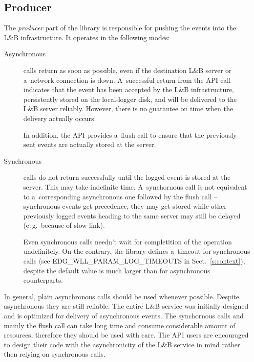 \documentclass{egee}
\def\LB{L\&B\xspace}
\def\eg{e.\,g.\xspace}
\begin{document}
\subsection{Producer}
\label{s:producer}
The \emph{producer} part of the library is responsible for
pushing the events into the \LB infrastructure.
It operates in the following modes:
\begin{description}
\item[Asynchronous] calls return as soon as possible, even if
the destination \LB server or a~network connection is down.
A~successful return from the API call
indicates that the event has been accepted by the \LB infrastructure,
persistently stored on the local-logger disk, and will be delivered to
the \LB server reliably.
However, there is no guarantee on time when the delivery actually occurs.

In addition, the API provides a~flush call to ensure that the previously
sent events are actually stored at the server.
\item[Synchronous] calls do not return successfully
until the logged event is stored at the server. 
This may take indefinite time.
A~synchornous call is not equivalent to a~corresponding asynchronous one
followed by the flush call -- synchronous events get precedence,
they may get stored while other previously logged
events heading to the same server may still be delayed (\eg\ because of
slow link).

Even synchronous calls needn't wait for completition of the operation
undefinitely.
On the contrary, the library defines a~timeout for synchronous calls
(see EDG\_WLL\_PARAM\_LOG\_TIMEOUTS in Sect.~\ref{s:context}),
despite the default value is much larger than for asynchronous counterparts.

\end{description}

In general, plain asynchronous calls should be used whenever possible.
Despite asynchronous they are still reliable.
The entire \LB service was initially designed and is optimized for delivery of 
asynchronous events.
The synchornous calls and mainly the flush call can take long time and consume
considerable amount of resources, therefore they should be used with care.
The API users are encouraged to design their code with the asynchronicity
of the \LB service in mind rather then relying on synchronous calls.
\end{document}
